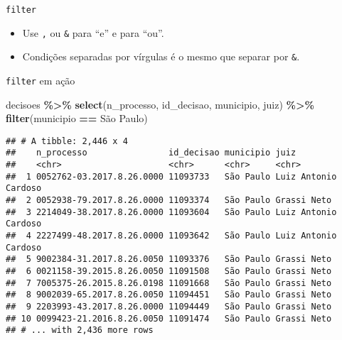\documentclass[
  10pt,
  ignorenonframetext,
]{beamer}
\newenvironment{Shaded}{\begin{snugshade}}{\end{snugshade}}
\newcommand{\KeywordTok}[1]{\textcolor[rgb]{0.13,0.29,0.53}{\textbf{#1}}}
\newcommand{\NormalTok}[1]{#1}
\newcommand{\OperatorTok}[1]{\textcolor[rgb]{0.81,0.36,0.00}{\textbf{#1}}}
\newcommand{\StringTok}[1]{\textcolor[rgb]{0.31,0.60,0.02}{#1}}
\providecommand{\tightlist}{%
  \setlength{\itemsep}{0pt}\setlength{\parskip}{0pt}}
\begin{document}
\begin{frame}[fragile]{\texttt{filter}}
\protect\hypertarget{filter-1}{}
\begin{itemize}
\tightlist
\item
  Use \texttt{,} ou \texttt{\&} para ``e'' e \texttt{\textbar{}} para
  ``ou''.
\item
  Condições separadas por vírgulas é o mesmo que separar por
  \texttt{\&}.
\end{itemize}
\end{frame}

\begin{frame}[fragile]{\texttt{filter} em ação}
\protect\hypertarget{filter-em-auxe7uxe3o}{}
\begin{Shaded}
\begin{Highlighting}[]
\NormalTok{decisoes }\OperatorTok{\%\textgreater{}\%}\StringTok{ }
\StringTok{  }\KeywordTok{select}\NormalTok{(n\_processo, id\_decisao, municipio, juiz) }\OperatorTok{\%\textgreater{}\%}\StringTok{ }
\StringTok{  }\KeywordTok{filter}\NormalTok{(municipio }\OperatorTok{==}\StringTok{ \textquotesingle{}São Paulo\textquotesingle{}}\NormalTok{)}
\end{Highlighting}
\end{Shaded}

\begin{verbatim}
## # A tibble: 2,446 x 4
##    n_processo                id_decisao municipio juiz                
##    <chr>                     <chr>      <chr>     <chr>               
##  1 0052762-03.2017.8.26.0000 11093733   São Paulo Luiz Antonio Cardoso
##  2 0052938-79.2017.8.26.0000 11093374   São Paulo Grassi Neto         
##  3 2214049-38.2017.8.26.0000 11093604   São Paulo Luiz Antonio Cardoso
##  4 2227499-48.2017.8.26.0000 11093642   São Paulo Luiz Antonio Cardoso
##  5 9002384-31.2017.8.26.0050 11093376   São Paulo Grassi Neto         
##  6 0021158-39.2015.8.26.0050 11091508   São Paulo Grassi Neto         
##  7 7005375-26.2015.8.26.0198 11091668   São Paulo Grassi Neto         
##  8 9002039-65.2017.8.26.0050 11094451   São Paulo Grassi Neto         
##  9 2203993-43.2017.8.26.0000 11094449   São Paulo Grassi Neto         
## 10 0099423-21.2016.8.26.0050 11091474   São Paulo Grassi Neto         
## # ... with 2,436 more rows
\end{verbatim}
\end{frame}
\end{document}
